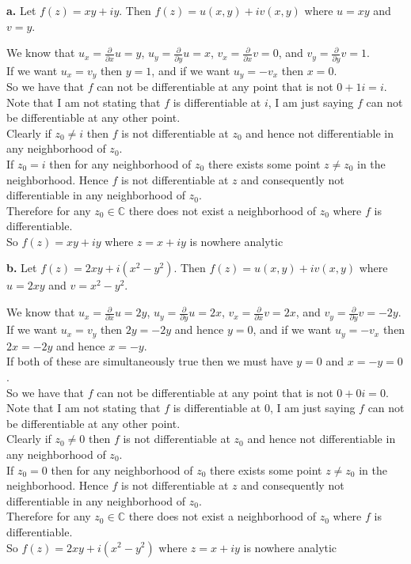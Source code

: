 \documentclass{article}
\begin{document}
{\Large\textbf{a.}} Let $f(z) = xy + iy$. Then $f(z) = u(x, y) + iv(x, y)$ where $u = xy$ and $v = y$.
\begin{center}
    \doublespacing
    We know that $u_x =\frac{\partial}{\partial x} u = y$, $u_y =\frac{\partial}{\partial y} u = x$, $v_x =\frac{\partial}{\partial x} v = 0$, and $v_y =\frac{\partial}{\partial y} v = 1$.
    \\If we want $u_x = v_y$ then $y = 1$, and if we want $u_y = -v_x$ then $x = 0$.
    \\So we have that $f$ can not be differentiable at any point that is not $0 + 1i = i$. Note that I am not stating that $f$ is differentiable at $i$, I am just saying $f$ can not be differentiable at any other point.
    \\Clearly if $z_0\neq i$ then $f$ is not differentiable at $z_0$ and hence not differentiable in any neighborhood of $z_0$.
    \\If $z_0 = i$ then for any neighborhood of $z_0$ there exists some point $z\neq z_0$ in the neighborhood. Hence $f$ is not differentiable at $z$ and consequently not differentiable in any neighborhood of $z_0$.
    \\Therefore for any $z_0\in\mathbb{C}$ there does not exist a neighborhood of $z_0$ where $f$ is differentiable.
    \\So $f(z) = xy + iy$ where $z = x + iy$ is nowhere analytic \qedsymbol
\end{center}

{\Large\textbf{b.}} Let $f(z) = 2xy + i(x^2 - y^2)$. Then $f(z) = u(x, y) + iv(x, y)$ where $u = 2xy$ and $v = x^2 - y^2$.
\begin{center}
    \doublespacing
    We know that $u_x =\frac{\partial}{\partial x} u = 2y$, $u_y =\frac{\partial}{\partial y} u = 2x$, $v_x =\frac{\partial}{\partial x} v = 2x$, and $v_y =\frac{\partial}{\partial y} v = -2y$.
    \\If we want $u_x = v_y$ then $2y = -2y$ and hence $y = 0$, and if we want $u_y = -v_x$ then $2x = -2y$ and hence $x = -y$.
    \\If both of these are simultaneously true then we must have $y = 0$ and $x = -y = 0$.
    \\So we have that $f$ can not be differentiable at any point that is not $0 + 0i = 0$. Note that I am not stating that $f$ is differentiable at $0$, I am just saying $f$ can not be differentiable at any other point.
    \\Clearly if $z_0\neq 0$ then $f$ is not differentiable at $z_0$ and hence not differentiable in any neighborhood of $z_0$.
    \\If $z_0 = 0$ then for any neighborhood of $z_0$ there exists some point $z\neq z_0$ in the neighborhood. Hence $f$ is not differentiable at $z$ and consequently not differentiable in any neighborhood of $z_0$.
    \\Therefore for any $z_0\in\mathbb{C}$ there does not exist a neighborhood of $z_0$ where $f$ is differentiable.
    \\So $f(z) = 2xy + i(x^2 - y^2)$ where $z = x + iy$ is nowhere analytic \qedsymbol
\end{center}
\end{document}
